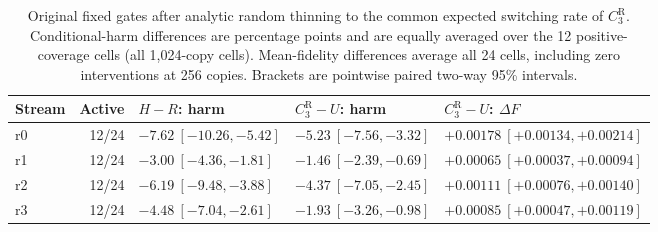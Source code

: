 \begin{table}[ht]
\centering
\scriptsize
\setlength{\tabcolsep}{3pt}
\caption{Original fixed gates after analytic random thinning to the common expected switching rate of $C_3^{\mathrm R}$. Conditional-harm differences are percentage points and are equally averaged over the 12 positive-coverage cells (all 1,024-copy cells). Mean-fidelity differences average all 24 cells, including zero interventions at 256 copies. Brackets are pointwise paired two-way 95\% intervals.}
\label{tab:r4-fixed}
\begin{tabular}{@{}lrlll@{}}
\toprule
Stream & Active & $H-R$: harm & $C_3^{\mathrm R}-U$: harm & $C_3^{\mathrm R}-U$: $\Delta F$ \\
\midrule
r0 & 12/24 & $-7.62\ [-10.26,-5.42]$ & $-5.23\ [-7.56,-3.32]$ & $+0.00178\ [+0.00134,+0.00214]$ \\
r1 & 12/24 & $-3.00\ [-4.36,-1.81]$ & $-1.46\ [-2.39,-0.69]$ & $+0.00065\ [+0.00037,+0.00094]$ \\
r2 & 12/24 & $-6.19\ [-9.48,-3.88]$ & $-4.37\ [-7.05,-2.45]$ & $+0.00111\ [+0.00076,+0.00140]$ \\
r3 & 12/24 & $-4.48\ [-7.04,-2.61]$ & $-1.93\ [-3.26,-0.98]$ & $+0.00085\ [+0.00047,+0.00119]$ \\
\bottomrule
\end{tabular}
\end{table}
